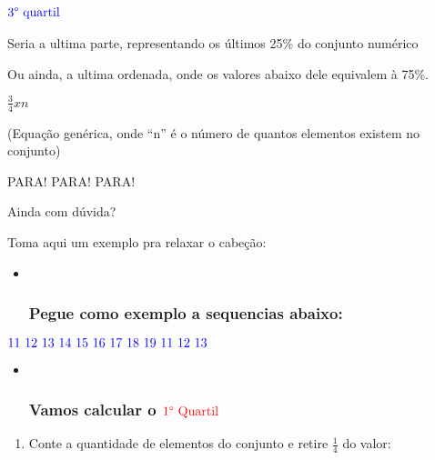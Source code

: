 \documentclass[]{book}
\providecommand{\tightlist}{%
  \setlength{\itemsep}{0pt}\setlength{\parskip}{0pt}}
\begin{document}
\hypertarget{colorbluetext3-quartil}{%
\subsubsection{\texorpdfstring{\(\color{blue}{\text{3° quartil}}\)}{\textbackslash{}color\{blue\}\{\textbackslash{}text\{3° quartil\}\}}}\label{colorbluetext3-quartil}}

Seria a ultima parte, representando os últimos 25\% do conjunto numérico

Ou ainda, a ultima ordenada, onde os valores abaixo dele equivalem à 75\%.

\(\frac{3}{4}xn\)

(Equação genérica, onde ``n'' é o número de quantos elementos existem no conjunto)

PARA! PARA! PARA!

Ainda com dúvida?

Toma aqui um exemplo pra relaxar o cabeção:

\begin{itemize}
\item ~
  \hypertarget{pegue-como-exemplo-a-sequencias-abaixo}{%
  \subsubsection{Pegue como exemplo a sequencias abaixo:}\label{pegue-como-exemplo-a-sequencias-abaixo}}
\end{itemize}

\(\color{blue}{\text{11 12 13 14 15 16 17 18 19 11 12 13}}\)

\begin{itemize}
\item ~
  \hypertarget{vamos-calcular-o-colorredtext1-quartil}{%
  \subsubsection{\texorpdfstring{Vamos calcular o \(\color{red}{\text{1° Quartil}}\)}{Vamos calcular o \textbackslash{}color\{red\}\{\textbackslash{}text\{1° Quartil\}\}}}\label{vamos-calcular-o-colorredtext1-quartil}}
\end{itemize}

\begin{enumerate}
\def\labelenumi{\arabic{enumi}.}
\tightlist
\item
  Conte a quantidade de elementos do conjunto e retire \(\frac{1}{4}\) do valor:
\end{enumerate}
\end{document}
